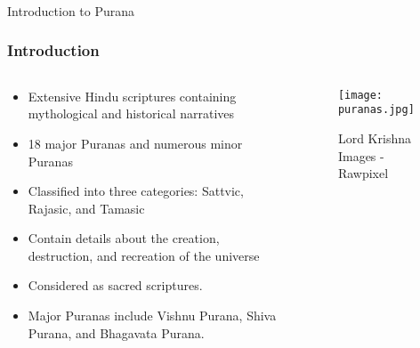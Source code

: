 \begin{frame}[fragile]\frametitle{}
\begin{center}
{\Large Introduction to Purana}
\end{center}
\end{frame}


\begin{frame}[fragile]\frametitle{Introduction}

  \begin{columns}[t]
    \begin{column}{0.5\textwidth}
      \begin{itemize}
		\item Extensive Hindu scriptures containing mythological and historical narratives
		\item 18 major Puranas and numerous minor Puranas
		\item Classified into three categories: Sattvic, Rajasic, and Tamasic
		\item Contain details about the creation, destruction, and recreation of the universe
        \item Considered as sacred scriptures.
        \item Major Puranas include Vishnu Purana, Shiva Purana, and Bhagavata Purana.
      \end{itemize}
    \end{column}
    \begin{column}{0.5\textwidth}
      \begin{figure}[h]
        \texttt{[image: puranas.jpg]}
        \caption{Lord Krishna Images - Rawpixel}
      \end{figure}
    \end{column}
  \end{columns}
\end{frame}